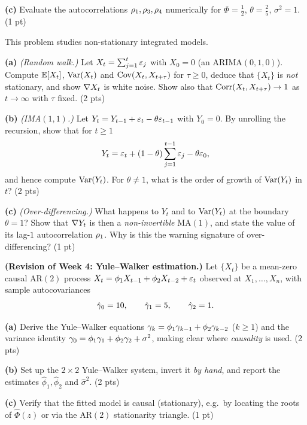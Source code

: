 \documentclass[11pt]{article}
\begin{document}
\textbf{(c)} Evaluate the autocorrelations $\rho_1,\rho_3,\rho_4$ numerically for $\Phi=\tfrac12$, $\theta=\tfrac25$, $\sigma^{2}=1$. \hfill(1 pt)
\answerpage

This problem studies non-stationary integrated models.

\textbf{(a)} \emph{(Random walk.)} Let $X_t=\sum_{j=1}^{t}\varepsilon_j$ with $X_0=0$ (an $\mathrm{ARIMA}(0,1,0)$). Compute $\mathbb{E}[X_t]$, $\operatorname{Var}(X_t)$ and $\operatorname{Cov}(X_t,X_{t+\tau})$ for $\tau\ge0$, deduce that $\{X_t\}$ is \emph{not} stationary, and show $\nabla X_t$ is white noise. Show also that $\operatorname{Corr}(X_t,X_{t+\tau})\to1$ as $t\to\infty$ with $\tau$ fixed. \hfill(2 pts)

\textbf{(b)} \emph{(IMA$(1,1)$.)} Let $Y_t=Y_{t-1}+\varepsilon_t-\theta\varepsilon_{t-1}$ with $Y_0=0$. By unrolling the recursion, show that for $t\ge1$
\[
Y_t=\varepsilon_t+(1-\theta)\sum_{j=1}^{t-1}\varepsilon_j-\theta\varepsilon_0 ,
\]
and hence compute $\operatorname{Var}(Y_t)$. For $\theta\neq1$, what is the order of growth of $\operatorname{Var}(Y_t)$ in $t$? \hfill(2 pts)

\textbf{(c)} \emph{(Over-differencing.)} What happens to $Y_t$ and to $\operatorname{Var}(Y_t)$ at the boundary $\theta=1$? Show that $\nabla Y_t$ is then a \emph{non-invertible} $\mathrm{MA}(1)$, and state the value of its lag-$1$ autocorrelation $\rho_1$. Why is this the warning signature of over-differencing? \hfill(1 pt)
\answerpage

\textbf{(Revision of Week 4: Yule--Walker estimation.)} Let $\{X_t\}$ be a mean-zero causal $\mathrm{AR}(2)$ process $X_t=\phi_1X_{t-1}+\phi_2X_{t-2}+\varepsilon_t$ observed at $X_1,\dots,X_n$, with sample autocovariances
\[
\hat{\gamma}_0=10,\qquad \hat{\gamma}_1=5,\qquad \hat{\gamma}_2=1 .
\]

\textbf{(a)} Derive the Yule--Walker equations $\gamma_k=\phi_1\gamma_{k-1}+\phi_2\gamma_{k-2}$ ($k\ge1$) and the variance identity $\gamma_0=\phi_1\gamma_1+\phi_2\gamma_2+\sigma^{2}$, making clear where \emph{causality} is used. \hfill(2 pts)

\textbf{(b)} Set up the $2\times2$ Yule--Walker system, invert it \emph{by hand}, and report the estimates $\hat\phi_1,\hat\phi_2$ and $\hat\sigma^{2}$. \hfill(2 pts)

\textbf{(c)} Verify that the fitted model is causal (stationary), e.g.\ by locating the roots of $\hat\Phi(z)$ or via the $\mathrm{AR}(2)$ stationarity triangle. \hfill(1 pt)
\answerpage
\end{document}
